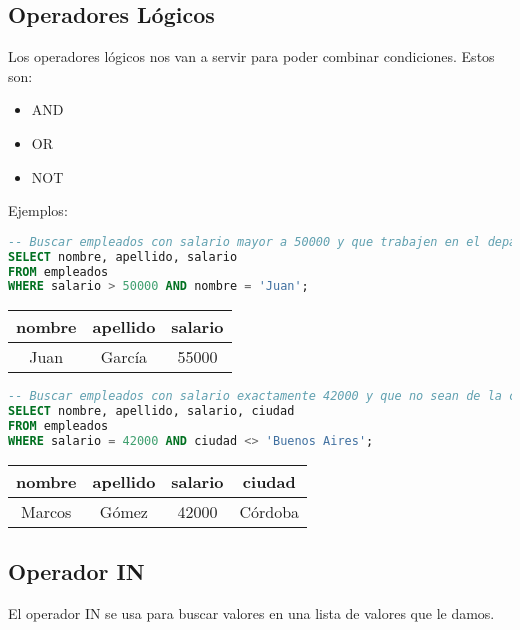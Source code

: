 \documentclass[12pt]{article}
\begin{document}
\subsection{Operadores Lógicos}
Los operadores lógicos nos van a servir para poder combinar condiciones. Estos son:
\begin{itemize}
    \item AND
    \item OR
    \item NOT
\end{itemize}

\vspace{1em}

Ejemplos:
\begin{lstlisting}[language=SQL]
-- Buscar empleados con salario mayor a 50000 y que trabajen en el departamento 1
SELECT nombre, apellido, salario
FROM empleados
WHERE salario > 50000 AND nombre = 'Juan';
\end{lstlisting}

\begin{center}

\begin{tabular}{ccc}
\toprule
nombre & apellido & salario \\
\midrule
Juan & García & 55000 \\
\bottomrule
\end{tabular}
\end{center}

\begin{lstlisting}[language=SQL]
-- Buscar empleados con salario exactamente 42000 y que no sean de la ciudad de Buenos Aires
SELECT nombre, apellido, salario, ciudad
FROM empleados
WHERE salario = 42000 AND ciudad <> 'Buenos Aires';
\end{lstlisting}

\begin{center}
\begin{tabular}{cccc}
\toprule
nombre & apellido & salario & ciudad \\
\midrule
Marcos & Gómez & 42000 & Córdoba \\
\bottomrule
\end{tabular}
\end{center}

\subsection{Operador IN}
El operador IN se usa para buscar valores en una lista de valores que le damos.
\end{document}

